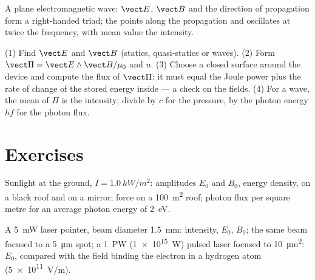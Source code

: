 \begin{omfigure}

{\small A plane electromagnetic wave: $\vect E$, $\vect B$ and the
direction of propagation form a right-handed triad; the  points along the propagation and oscillates at twice the
frequency, with mean value the intensity.}
\end{omfigure}

\begin{method}\label{met:b2:poynting-vector:method}
(1) Find $\vect E$ and $\vect B$ (statics, quasi-statics or waves). (2)
Form $\vect\Pi = \vect E\wedge\vect B/\mu_0$ and $u$. (3) Choose a closed
surface around the device and compute the flux of $\vect\Pi$: it must
equal the Joule power plus the rate of change of the stored energy
inside --- a check on the fields. (4) For a wave, the mean of $\Pi$ is
the intensity; divide by $c$ for the pressure, by the photon energy
$hf$ for the photon flux.
\end{method}

\section{Exercises}

\begin{exercise}[$\star$]\label{exo:b2:poynting-vector:1}
Sunlight at the ground, $I = \qty{1.0}{kW/m^2}$: amplitudes $E_0$ and $B_0$,
energy density,  on a black roof and on a mirror;
force on a \qty{100}{m^2} roof; photon flux per square metre for an
average photon energy of \qty{2}{eV}.
\end{exercise}

\begin{exercise}[$\star$]\label{exo:b2:poynting-vector:2}
A \qty{5}{mW} laser pointer, beam diameter \qty{1.5}{mm}: intensity, $E_0$,
$B_0$; the same beam focused to a \qty{5}{\micro m} spot; a \qty{1}{PW}
(\qty{1e15}{W}) pulsed laser focused to \qty{10}{\micro m^2}: $E_0$, compared
with the field binding the electron in a hydrogen atom (\qty{5e11}{V/m}).
\end{exercise}

